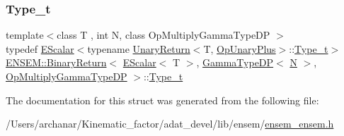 \subsubsection{\texorpdfstring{Type\_t}{Type\_t}\hspace{0.1cm}{\footnotesize\ttfamily [2/2]}}
{\footnotesize\ttfamily template$<$class T , int N, class Op\+Multiply\+Gamma\+Type\+DP $>$ \\
typedef \mbox{\hyperlink{classENSEM_1_1EScalar}{E\+Scalar}}$<$typename \mbox{\hyperlink{structENSEM_1_1UnaryReturn}{Unary\+Return}}$<$T, \mbox{\hyperlink{structENSEM_1_1OpUnaryPlus}{Op\+Unary\+Plus}}$>$\+::\mbox{\hyperlink{structENSEM_1_1BinaryReturn_3_01EScalar_3_01T_01_4_00_01GammaTypeDP_3_01N_01_4_00_01OpMultiplyGammaTypeDP_01_4_a6d1755953f12843663e53d693c99e7f8}{Type\+\_\+t}}$>$ \mbox{\hyperlink{structENSEM_1_1BinaryReturn}{E\+N\+S\+E\+M\+::\+Binary\+Return}}$<$ \mbox{\hyperlink{classENSEM_1_1EScalar}{E\+Scalar}}$<$ T $>$, \mbox{\hyperlink{classENSEM_1_1GammaTypeDP}{Gamma\+Type\+DP}}$<$ \mbox{\hyperlink{operator__name__util_8cc_a7722c8ecbb62d99aee7ce68b1752f337}{N}} $>$, \mbox{\hyperlink{structENSEM_1_1OpMultiplyGammaTypeDP}{Op\+Multiply\+Gamma\+Type\+DP}} $>$\+::\mbox{\hyperlink{structENSEM_1_1BinaryReturn_3_01EScalar_3_01T_01_4_00_01GammaTypeDP_3_01N_01_4_00_01OpMultiplyGammaTypeDP_01_4_a6d1755953f12843663e53d693c99e7f8}{Type\+\_\+t}}}



The documentation for this struct was generated from the following file\+:\begin{DoxyCompactItemize}
\item 
/\+Users/archanar/\+Kinematic\+\_\+factor/adat\+\_\+devel/lib/ensem/\mbox{\hyperlink{lib_2ensem_2ensem__ensem_8h}{ensem\+\_\+ensem.\+h}}\end{DoxyCompactItemize}
